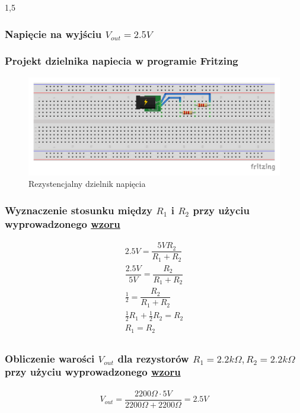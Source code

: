 \documentclass[polish,polish,a4paper]{article}
\begin{document}
\begin{spacing}{1,5}
		\subsubsection{Napięcie na wyjściu $V_{out} =  2.5V $}
		\subsubsection*{Projekt dzielnika napiecia w programie Fritzing}
		
		\begin{figure}[H]
			\centering
			\includegraphics[scale=0.9]{2_5_bb.pdf}
			\caption{Rezystencjalny dzielnik napięcia}
			\label{fig:pod2_5}
		\end{figure}
		
		\subsubsection*{Wyznaczenie stosunku między $ R_{1} $ i $ R_{2} $ przy użyciu wyprowadzonego \hyperref[eq:vout]{wzoru}}
		\begin{gather*}
		2.5V = \dfrac{5VR_{2}}{R_{1}+R_{2}}\\
		\dfrac{2.5V}{5V} = \dfrac{R_{2}}{R_{1} + R_{2}}\\
		\frac{1}{2} = \dfrac{R_{2}}{R_{1} + R_{2}}\\
		\frac{1}{2} R_{1} + \frac{1}{2}R_{2} = R_{2}\\
		R_{1} = R_{2}\\
		\end{gather*}
		\subsubsection*{Obliczenie warości $ V_{out}$ dla rezystorów $ R_{1} = 2.2k\Omega, R_{2} =2.2k\Omega  $  przy użyciu wyprowadzonego \hyperref[eq:vout]{wzoru}}
		\begin{gather*}
		V_{out} = \dfrac{2200\Omega \cdot 5V}{2200\Omega + 2200\Omega} = 2.5V\\
		\end{gather*}

\end{spacing}
\end{document}
